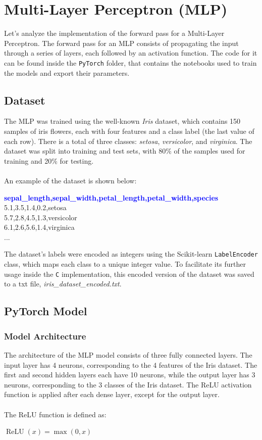 \documentclass{article}
\begin{document}
\section{Multi-Layer Perceptron (MLP)}
Let's analyze the implementation of the forward pass for a Multi-Layer Perceptron. The forward pass for an MLP consists of propagating the input through a series of layers, each followed by an activation function.
The code for it can be found inside the \texttt{PyTorch} folder, that contains the notebooks used to train the models and export their parameters.

\subsection{Dataset}
The MLP was trained using the well-known \textit{Iris} dataset, which contains 150 samples of iris flowers, each with four features and a class label (the last value of each row).
There is a total of three classes: \textit{setosa}, \textit{versicolor}, and \textit{virginica}.
The dataset was split into training and test sets, with 80\% of the samples used for training and 20\% for testing.
\\\\An example of the dataset is shown below:

\begin{tcolorbox}[colback=gray!5, colframe=black, rounded corners, boxrule=0.1mm]
\textbf{\textcolor{blue}{sepal\_length,sepal\_width,petal\_length,petal\_width,species}} \\
5.1,3.5,1.4,0.2,setosa \\
5.7,2.8,4.5,1.3,versicolor \\
6.1,2.6,5.6,1.4,virginica \\
...
\end{tcolorbox}

The dataset's labels were encoded as integers using the Scikit-learn \texttt{LabelEncoder} class, which maps each class to a unique integer value. To facilitate its further usage inside the \texttt{C} implementation, this encoded version of the dataset was saved to a txt file, \textit{iris\_dataset\_encoded.txt}.

\subsection{PyTorch Model}
\subsubsection{Model Architecture}
The architecture of the MLP model consists of three fully connected layers.  
The input layer has 4 neurons, corresponding to the 4 features of the Iris dataset. 
The first and second hidden layers each have 10 neurons, while the output layer has 3 neurons, corresponding to the 3 classes of the Iris dataset.  
The ReLU activation function is applied after each dense layer, except for the output layer.  
\\\\The ReLU function is defined as:  
\begin{center}
$\operatorname{ReLU}(x) = \max(0, x)$
\end{center}
\end{document}
